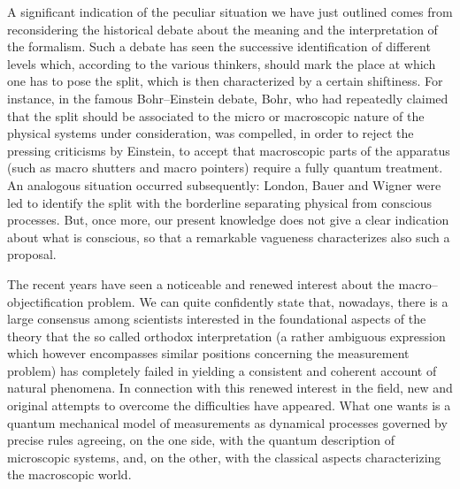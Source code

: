 \documentclass[12pt]{article}
\begin{document}
A significant  indication of the peculiar situation we have just
outlined comes from reconsidering the historical debate about the
meaning and the interpretation of the formalism. Such a debate has
seen the successive identification of different levels which,
according to the various thinkers, should mark the place at which
one has to pose the split, which is then characterized by a
certain shiftiness.  For instance, in the famous Bohr--Einstein
debate, Bohr, who had repeatedly claimed that the split should be
associated to the micro or macroscopic nature of the physical
systems under consideration, was compelled, in order to reject the
pressing criticisms by Einstein,  to accept that macroscopic parts
of the apparatus (such as macro shutters and macro pointers)
require a fully quantum treatment. An analogous situation occurred
subsequently: London, Bauer and Wigner were led to identify the
split with the borderline separating physical from conscious
processes. But, once more, our present knowledge does not give a
clear indication about what is conscious, so that a remarkable
vagueness characterizes also such a proposal.

The recent years have seen a noticeable and renewed interest about
the macro--objectification problem. We can quite confidently state
that, nowadays, there is a large consensus among scientists
interested in the foundational aspects of the theory that the so
called orthodox interpretation (a rather ambiguous expression
which however encompasses similar positions concerning the
measurement problem) has completely failed in yielding a
consistent and coherent account of natural phenomena. In
connection with this renewed interest in the field, new and
original attempts to overcome the difficulties have appeared. What
one wants is a quantum mechanical model of measurements as
dynamical processes governed by precise rules agreeing, on the one
side, with the quantum description of microscopic systems, and, on
the other, with the classical aspects characterizing the
macroscopic world.
\end{document}
